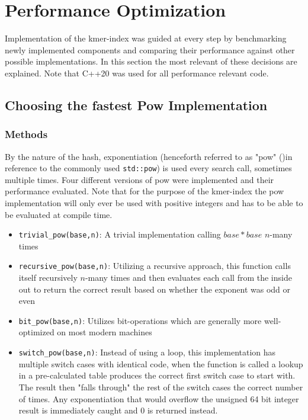 \section{Performance Optimization}
Implementation of the kmer-index was guided at every step by benchmarking
newly implemented components and comparing their performance against
other possible implementations. In this section the most relevant
of these decisions are explained. Note that C++20 was used for all
performance relevant code.

\subsection{Choosing the fastest Pow Implementation}
\subsubsection{Methods}
By the nature of the hash, exponentiation (henceforth referred to
as "pow" ()in reference to the commonly used \lstinline{std::pow})
is used every search call, sometimes multiple times. Four different versions of pow were
implemented and their performance evaluated. Note that for the purpose of the kmer-index the pow implementation
will only ever be used with positive integers and has to be able to be evaluated at compile time.

\begin{itemize}
\item \lstinline{trivial_pow(base,n)}: A trivial implementation calling $base*base$ $n$-many
times
\item \lstinline{recursive_pow(base,n)}: Utilizing a recursive approach,
this function calls itself recursively $n$-many times and then evaluates
each call from the inside out to return the correct result based on
whether the exponent was odd or even
\item \lstinline{bit_pow(base,n)}: Utilizes bit-operations which are generally
more well-optimized on most modern machines
\item \lstinline{switch_pow(base,n)}: Instead of using a loop, this implementation
has multiple switch cases with identical code, when the function is
called a lookup in a pre-calculated table produces the correct first
switch case to start with. The result then "falls through" the rest
of the switch cases the correct number of times. Any exponentiation
that would overflow the unsigned 64 bit integer result is immediately
caught and 0 is returned instead.
\end{itemize}
